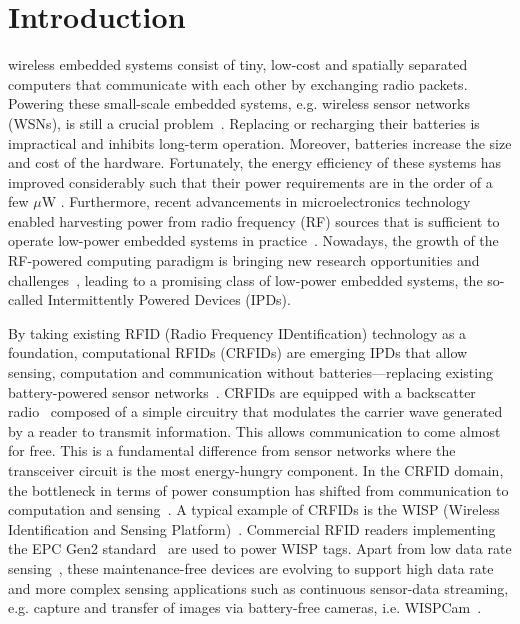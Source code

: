 \documentclass[journal,draftcls,onecolumn,12pt,twoside]{IEEEtranTCOM}
\begin{document}
\IEEEpeerreviewmaketitle

\section{Introduction}
\label{sec:Intro}

 wireless embedded systems consist of tiny, low-cost and spatially separated computers that communicate with each other by exchanging radio packets. Powering these small-scale embedded systems, e.g. wireless sensor networks (WSNs), is still a crucial problem~\cite{emergence}. Replacing or recharging their batteries is impractical and inhibits long-term operation. Moreover, batteries increase the size and cost of the hardware. Fortunately, the energy efficiency of these systems has improved considerably such that their power requirements are in the order of a few $\mu$W \cite{booksmith2013}. Furthermore, recent advancements in microelectronics technology enabled harvesting power from radio frequency (RF) sources that is sufficient to operate low-power embedded systems in practice~\cite{60ghz,emergence,bi:commag:2015,xie_wcom_2013,garnica_procieee_2013}. Nowadays, the growth of the RF-powered computing paradigm is bringing new research opportunities and challenges~\cite{emergence}, leading to a promising class of low-power embedded systems, the so-called Intermittently Powered Devices (IPDs).

By taking existing RFID (Radio Frequency IDentification) technology as a foundation, computational RFIDs (CRFIDs) are emerging IPDs that allow sensing, computation and communication without batteries---replacing existing battery-powered sensor networks~\cite{booksmith2013}. CRFIDs are equipped with a backscatter radio~\cite[Chapter 4]{rfid_handbook} composed of a simple circuitry that modulates the carrier wave generated by a reader to transmit information. This allows communication to come almost for free. This is a fundamental difference from sensor networks where the transceiver circuit is the most energy-hungry component. In the CRFID domain, the bottleneck in terms of power consumption has shifted from communication to computation and sensing~\cite{ekhonet}. A typical example of CRFIDs is the WISP (Wireless Identification and Sensing Platform)~\cite{wisp}. Commercial RFID readers implementing the EPC Gen2 standard~\cite{epc_gen2} are used to power WISP tags. Apart from low data rate sensing~\cite{neuralWISP}, these maintenance-free devices are evolving to support high data rate and more complex sensing applications such as continuous sensor-data streaming, e.g. capture and transfer of images via battery-free cameras, i.e. WISPCam~\cite{wispcam_2015,cameralocalize_2015}.
\end{document}
